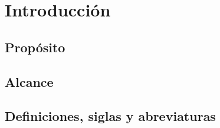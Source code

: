 \chapter{Introducción}

\section{Propósito}

\section{Alcance}

\section{Definiciones, siglas y abreviaturas}

